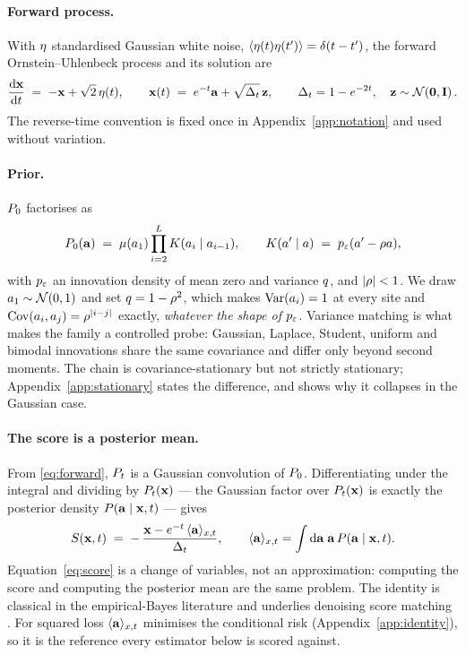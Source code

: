 
\paragraph{Forward process.} With $\mathbf{\eta}$ standardised Gaussian white noise,
$\langle\mathbf{\eta}(t)\mathbf{\eta}(t')\rangle=\delta(t-t')$, the forward Ornstein--Uhlenbeck process and its
solution are
\begin{equation}
\label{eq:forward}
\frac{\mathrm{d}\mathbf{x}}{\mathrm{d}t} \;=\; -\mathbf{x} + \sqrt{2}\,\mathbf{\eta}(t),
\qquad
\mathbf{x}(t) \;=\; e^{-t} \mathbf{a} + \sqrt{\Delta_t}\, \mathbf{z},
\qquad
\Delta_t = 1 - e^{-2t},
\quad \mathbf{z}\sim\mathcal{N}\!\left(\mathbf{0},\mathbf{I}\right).
\end{equation}
The reverse-time convention is fixed once in Appendix~\ref{app:notation} and used without
variation.

\paragraph{Prior.} $P_0$ factorises as
\begin{equation}
\label{eq:prior}
P_0(\mathbf{a}) \;=\; \mu(a_1)\prod_{i=2}^{L} K(a_i \mid a_{i-1}),
\qquad
K(a'\mid a) \;=\; p_{\varepsilon}(a' - \rho a),
\end{equation}
with $p_{\varepsilon}$ an innovation density of mean zero and variance $q$, and $|\rho|<1$. We draw
$a_1\sim\mathcal{N}\!\left(0,1\right)$ and set $q = 1-\rho^2$, which makes $\operatorname{Var}(a_i)=1$ at every site and
$\operatorname{Cov}(a_i,a_j)=\rho^{|i-j|}$ exactly, \emph{whatever the shape of $p_{\varepsilon}$}. Variance matching is
what makes the family a controlled probe: Gaussian, Laplace, Student, uniform and bimodal
innovations share the same covariance and differ only beyond second moments. The chain is
covariance-stationary but not strictly stationary; Appendix~\ref{app:stationary} states the
difference, and shows why it collapses in the Gaussian case.

\paragraph{The score is a posterior mean.} From \eqref{eq:forward}, $P_t$ is a Gaussian
convolution of $P_0$. Differentiating under the integral and dividing by $P_t(\mathbf{x})$ --- the
Gaussian factor over $P_t(\mathbf{x})$ is exactly the posterior density $P(\mathbf{a}\mid \mathbf{x},t)$ --- gives
\begin{equation}
\label{eq:score}
S(\mathbf{x},t) \;=\; -\,\frac{\mathbf{x} - e^{-t}\,\langle \mathbf{a} \rangle_{x,t}}{\Delta_t},
\qquad
\langle \mathbf{a} \rangle_{x,t} = \int \mathrm{d}\mathbf{a}\; \mathbf{a}\, P(\mathbf{a}\mid \mathbf{x},t).
\end{equation}
Equation~\eqref{eq:score} is a change of variables, not an approximation: computing the score and
computing the posterior mean are the same problem. The identity is classical in the
empirical-Bayes literature \citep{robbins1956empirical,miyasawa1961empirical,efron2011tweedie} and underlies denoising
score matching \citep{vincent2011connection,hyvarinen2005estimation}. For squared loss $\langle \mathbf{a} \rangle_{x,t}$ minimises the
conditional risk (Appendix~\ref{app:identity}), so it is the reference every estimator below is
scored against.
